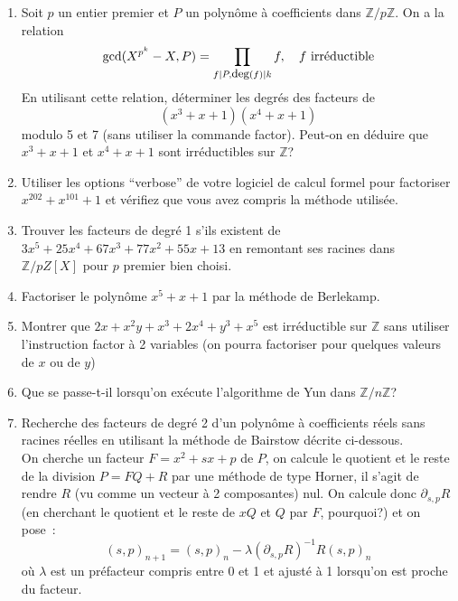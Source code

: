 \documentclass[a4paper,11pt]{article}
\begin{document}
\begin{giacjshere}
\begin{enumerate}
en utilisant une méthode itérative de type méthode de Newton 
(avec éventuellement un préfacteur lorsqu'on débute la recherche).
Les polynômes seront représentés par la liste de leurs coefficients
et l'évaluation faite par la méthode de Horner.
Trouver ensuite toutes les racines du polynôme en éliminant la
racine trouvée (toujours avec Horner). Trouver les combinaisons
de racines correspondant à un facteur à coefficients entiers.
\item Soit $p$ un entier premier et $P$ un polynôme \`a
coefficients dans $\mathbb{Z}/p\mathbb{Z}$. On a la relation
\[ \mbox{gcd}(X^{p^k}-X,P) = \prod_{ f | P, \mbox{\small deg}(f) | k} f, 
\quad f \mbox{ irréductible} \]
En utilisant cette relation, 
déterminer les degrés des facteurs de 
\[ (x^3+x+1)(x^4+x+1) \]
modulo 5 et 7 (sans utiliser la commande factor). 
Peut-on en déduire que $x^3+x+1$ et
$x^4+x+1$ sont irréductibles sur $\mathbb{Z}$?
\item Utiliser les options ``verbose'' de votre logiciel de calcul formel
pour factoriser $x^{202}+x^{101}+1$ et vérifiez que vous avez compris
la méthode utilisée.
\item Trouver les facteurs de degré 1 s'ils existent de
$3x^5+25x^4+67x^3+77x^2+55x+13$ en remontant ses racines
dans $\mathbb{Z}/pZ[X]$ pour $p$ premier bien choisi.
\item Factoriser le polynôme $x^5+x+1$ par la méthode 
de Berlekamp.
\item Montrer que $2x+x^2y+x^3+2x^4+y^3+x^5$ est irréductible sur $\mathbb{Z}$
sans utiliser l'instruction factor à 2 variables (on pourra factoriser 
pour quelques valeurs de $x$ ou de $y$)

\item Que se passe-t-il lorsqu'on ex\'ecute l'algorithme de Yun
dans $\mathbb{Z}/n\mathbb{Z}$?

\item Recherche des facteurs de degré 2 d'un polynôme à coefficients
réels sans racines réelles en utilisant la méthode de Bairstow décrite
ci-dessous.\\
On cherche un facteur $F=x^2+sx+p$ de $P$, on calcule le quotient et le reste
de la division $P=FQ+R$ par une méthode de type Horner, il s'agit de 
rendre $R$ (vu comme un vecteur à 2 composantes) nul. On calcule
donc $\partial_{s,p} R$ (en cherchant le quotient et le reste
de $xQ$ et $Q$ par $F$, pourquoi?) et on pose~:
\[(s,p)_{n+1}=(s,p)_n- \lambda (\partial_{s,p} R)^{-1} R (s,p)_n\]
où $\lambda$ est un préfacteur compris entre 0 et 1 et ajusté à 1 
lorsqu'on est proche du facteur.



\end{enumerate}
\end{giacjshere}
\end{document}
